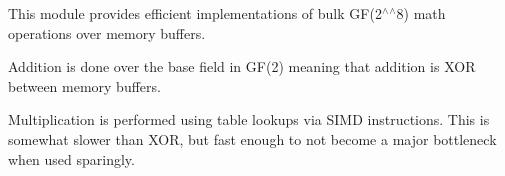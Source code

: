 This module provides efficient implementations of bulk G\+F(2$^\wedge$$^\wedge$8) math operations over memory buffers.

Addition is done over the base field in G\+F(2) meaning that addition is X\+OR between memory buffers.

Multiplication is performed using table lookups via S\+I\+MD instructions. This is somewhat slower than X\+OR, but fast enough to not become a major bottleneck when used sparingly. 